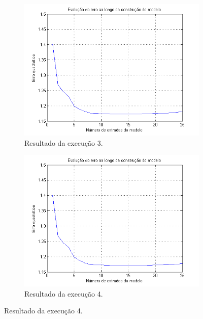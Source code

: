\begin{figure}[H]
			\begin{subfigure}{.5\textwidth}
				  \centering
				  \includegraphics[width=1\linewidth]{image/forward3}
				  \caption{Resultado da execução 3.}
				  \label{forward3}
				\end{subfigure}%
				\begin{subfigure}{.5\textwidth}
				  \centering
				  \includegraphics[width=1\linewidth]{image/forward4}
				  \caption{Resultado da execução 4.}
				  \label{forward4}
				\end{subfigure}			
			

\end{figure}
